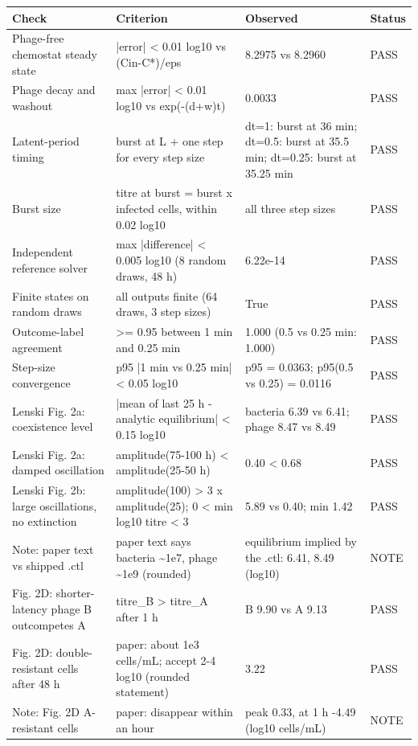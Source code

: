 \begin{tabular}{llll}
\toprule
Check & Criterion & Observed & Status \\
\midrule
Phage-free chemostat steady state & |error| < 0.01 log10 vs (Cin-C*)/eps & 8.2975 vs 8.2960 & PASS \\
Phage decay and washout & max |error| < 0.01 log10 vs exp(-(d+w)t) & 0.0033 & PASS \\
Latent-period timing & burst at L + one step for every step size & dt=1: burst at 36 min; dt=0.5: burst at 35.5 min; dt=0.25: burst at 35.25 min & PASS \\
Burst size & titre at burst = burst x infected cells, within 0.02 log10 & all three step sizes & PASS \\
Independent reference solver & max |difference| < 0.005 log10 (8 random draws, 48 h) & 6.22e-14 & PASS \\
Finite states on random draws & all outputs finite (64 draws, 3 step sizes) & True & PASS \\
Outcome-label agreement & >= 0.95 between 1 min and 0.25 min & 1.000 (0.5 vs 0.25 min: 1.000) & PASS \\
Step-size convergence & p95 |1 min vs 0.25 min| < 0.05 log10 & p95 = 0.0363; p95(0.5 vs 0.25) = 0.0116 & PASS \\
Lenski Fig. 2a: coexistence level & |mean of last 25 h - analytic equilibrium| < 0.15 log10 & bacteria 6.39 vs 6.41; phage 8.47 vs 8.49 & PASS \\
Lenski Fig. 2a: damped oscillation & amplitude(75-100 h) < amplitude(25-50 h) & 0.40 < 0.68 & PASS \\
Lenski Fig. 2b: large oscillations, no extinction & amplitude(100) > 3 x amplitude(25); 0 < min log10 titre < 3 & 5.89 vs 0.40; min 1.42 & PASS \\
Note: paper text vs shipped .ctl & paper text says bacteria \textasciitilde 1e7, phage \textasciitilde 1e9 (rounded) & equilibrium implied by the .ctl: 6.41, 8.49 (log10) & NOTE \\
Fig. 2D: shorter-latency phage B outcompetes A & titre\_B > titre\_A after 1 h & B 9.90 vs A 9.13 & PASS \\
Fig. 2D: double-resistant cells after 48 h & paper: about 1e3 cells/mL; accept 2-4 log10 (rounded statement) & 3.22 & PASS \\
Note: Fig. 2D A-resistant cells & paper: disappear within an hour & peak 0.33, at 1 h -4.49 (log10 cells/mL) & NOTE \\
\bottomrule
\end{tabular}
